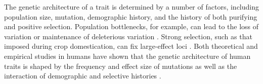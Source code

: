 The genetic architecture of a trait is determined by a number of factors, including population size, mutation, demographic history, and the history of both purifying and positive selection. Population bottlenecks, for example, can lead to the loss of variation or maintenance of deleterious variation \citep[e.g.][]{Renaut:2015hi, Gunther:2010}. Strong selection, such as that imposed during crop domestication, can fix large-effect loci \citep{Brown:2011}. Both theoretical and empirical studies in humans have shown that the genetic architecture of human traits is shaped by the frequency and effect size of mutations \citep{Thornton:2013} as well as the interaction of demographic and selective histories \citep{Fu:2014jt, Gravel:2011iq, Henn:2015dp}.


